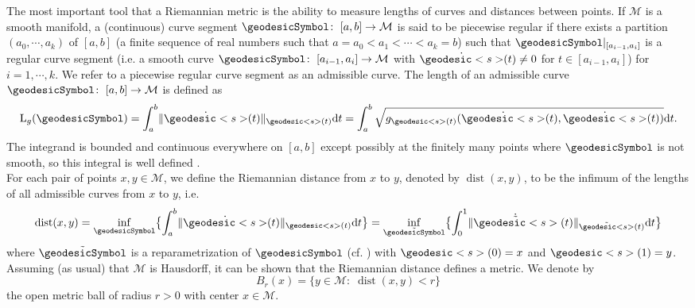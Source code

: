The most important tool that a Riemannian metric is the ability to measure lengths of curves and distances between points. If $\mathcal{M}$ is a smooth manifold, a (continuous) curve segment $\geodesicSymbol \colon \; [a,b] \to \mathcal{M}$ is said to be piecewise regular if there exists a partition $(a_0, \cdots, a_k)$ of $[a,b]$ (a finite sequence of real numbers such that $a = a_0 < a_1 < \cdots < a_k = b$) such that $\geodesicSymbol \vert_{[a_{i-1}, a_i]}$ is a regular curve segment (i.e. a smooth curve $\geodesicSymbol \colon \; [a_{i-1}, a_i] \to \mathcal{M}$ with $\dot{\geodesic<s>}(t) \neq 0$ for $t \in [a_{i-1}, a_i]$) for $i = 1, \cdots, k$. We refer to a piecewise regular curve segment as an admissible curve. The length of an admissible curve $\geodesicSymbol \colon \; [a,b] \to \mathcal{M}$ is defined as
\begin{equation*}
    \mathrm{L}_g(\geodesicSymbol) = \int^{b}_a \lVert \dot{\geodesic<s>}(t) \rVert_{\geodesic<s>(t)} \mathrm{d}t = \int^{b}_a \sqrt{ g_{\geodesic<s>(t)} (\dot{\geodesic<s>}(t), \dot{\geodesic<s>}(t)) } \mathrm{d}t.
\end{equation*}
The integrand is bounded and continuous everywhere on $[a,b]$ except possibly at the finitely many points where $\geodesicSymbol$ is not smooth, so this integral is well defined \cite[p.~33-34]{Lee:2019}. \\
For each pair of points $x, y \in \mathcal{M}$, we define the Riemannian distance from $x$ to $y$, denoted by $\operatorname{dist}(x,y)$, to be the infimum of the lengths of all admissible curves from $x$ to $y$, i.e.
\begin{equation*}
    \operatorname{dist}(x,y) = \inf_{\geodesicSymbol} \bigl\{ \int^{b}_a \lVert \dot{\geodesic<s>}(t) \rVert_{\geodesic<s>(t)} \mathrm{d}t \bigr\} = \inf_{\tilde{\geodesicSymbol}} \bigl\{ \int^{1}_0 \lVert \dot{\tilde{\geodesic<s>}}(t) \rVert_{\tilde{\geodesic<s>}(t)} \mathrm{d}t \bigr\}
\end{equation*}
where $\tilde{\geodesicSymbol}$ is a reparametrization of $\geodesicSymbol$ (cf. \cite[p.~34]{Lee:2019}) with $\geodesic<s>(0) = x$ and $\geodesic<s>(1) = y$. Assuming (as usual) that $\mathcal{M}$ is Hausdorff, it can be shown that the Riemannian distance defines a metric. We denote by
\begin{equation*}
    B_r(x) = \{ y \in \mathcal{M} \colon \; \operatorname{dist}(x,y) < r \}
\end{equation*}
the open metric ball of radius $r > 0$ with center $x \in \mathcal{M}$. \\
